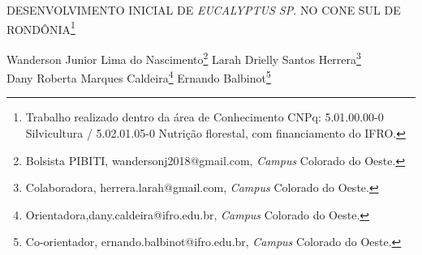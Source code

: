 \documentclass[article,12pt,onesidea,4paper,english,brazil]{abntex2}
\begin{document}
	
	
	\frenchspacing 
	
	\begin{center}
		\LARGE DESENVOLVIMENTO INICIAL DE \textit{EUCALYPTUS SP.} NO CONE SUL DE RONDÔNIA\footnote{Trabalho realizado dentro da área de Conhecimento CNPq: 5.01.00.00-0 Silvicultura / 5.02.01.05-0	Nutrição florestal, com financiamento do IFRO.}
		
		\normalsize
		Wanderson Junior Lima do Nascimento\footnote{Bolsista PIBITI, wandersonj2018@gmail.com, \textit{Campus} Colorado do Oeste.} 
		Larah Drielly Santos Herrera\footnote{Colaboradora, herrera.larah@gmail.com, \textit{Campus} Colorado do Oeste.} \\
		Dany Roberta Marques Caldeira\footnote{Orientadora,dany.caldeira@ifro.edu.br, \textit{Campus} Colorado do Oeste.} 
		Ernando Balbinot\footnote{Co-orientador, ernando.balbinot@ifro.edu.br, \textit{Campus} Colorado do Oeste.} 
	\end{center}
	
\end{document}
